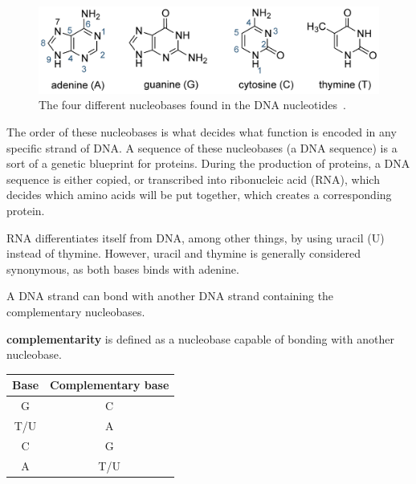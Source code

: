 \documentclass[12pt]{article}
\theoremstyle{definition}
\begin{document}
\begin{figure}[H]
\label{dnabases}
\begin{center}
	\includegraphics[scale=1.3]{DNA-heterocyclic-bases-large.png}
\end{center}
\caption{The four different nucleobases found in the DNA nucleotides~\cite{DNA-biotechacademy}.}
\end{figure}

The order of these nucleobases is what decides what function is encoded in any specific strand of DNA. A sequence of these nucleobases (a DNA sequence) is a sort of a genetic blueprint for proteins. During the production of proteins, a DNA sequence is either copied, or transcribed into ribonucleic acid (RNA), which decides which amino acids will be put together, which creates a corresponding protein.

RNA differentiates itself from DNA, among other things, by using uracil (U) instead of thymine. However, uracil and thymine is generally considered synonymous, as both bases binds with adenine.

A DNA strand can bond with another DNA strand containing the complementary nucleobases.

\begin{definition}
\textbf{complementarity} is defined as a nucleobase capable of bonding with another nucleobase.
\begin{center}
\begin{tabular}{|c|c|}
\hline
Base & Complementary base \\
\hline
G & C \\
T/U & A \\
C & G \\
A & T/U \\
\hline
\end{tabular}
\end{center}
\end{definition}
\end{document}

